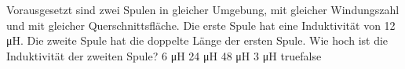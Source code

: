     {Vorausgesetzt sind zwei Spulen in gleicher Umgebung, mit gleicher Windungszahl und mit gleicher Querschnittsfläche. Die erste Spule hat eine Induktivität von 12 \si{\micro\henry}. Die zweite Spule hat die doppelte Länge der ersten Spule. Wie hoch ist die Induktivität der zweiten Spule?}
    {6 \si{\micro\henry}}
    {24 \si{\micro\henry}}
    {48 \si{\micro\henry}}
    {3 \si{\micro\henry}}
    {true}{false}